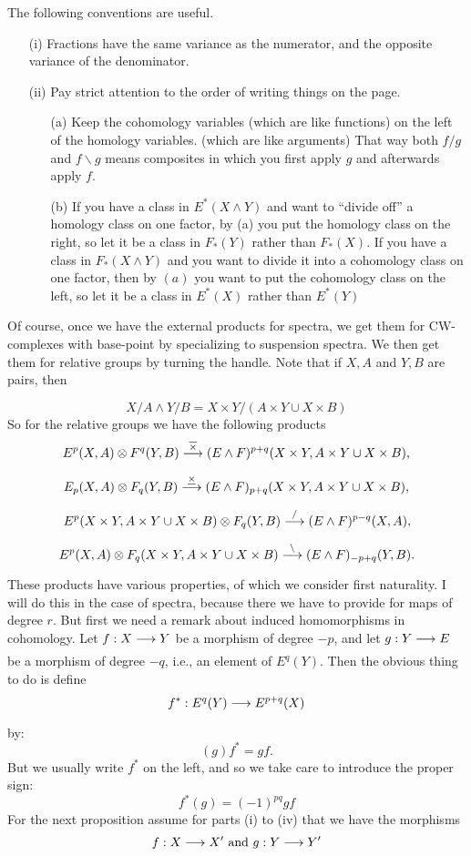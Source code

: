 \documentclass[../main]{subfiles}
\begin{document}
\begin{notes}
The following conventions are useful. 

\begin{enumerate}
    \item[(i)] Fractions have the same variance as the numerator, and the opposite variance of the denominator.
    \item [(ii)] Pay strict attention to the order of writing things on the page. 
    
    \begin{enumerate}
        \item[(a)] Keep the cohomology variables (which are like functions) on the left of the homology variables. (which are like arguments) That way both $f/g$ and $f \backslash g$ means composites in which you first apply $g$ and afterwards apply $f$.
        \item[(b)] If you have a class in $E^\ast(X \wedge Y)$ and want to ``divide off'' a homology class on one factor, by (a) you put the homology class on the right, so let it be a class in $F_\ast(Y)$ rather than $F_\ast(X)$. If you have a class in $F_\ast(X\wedge Y)$ and you want to divide it into a cohomology class on one factor, then by $(a)$ you want to put the cohomology class on the left, so let it be a class in $E^\ast(X)$ rather than $E^\ast (Y)$  
    \end{enumerate}
\end{enumerate}
\end{notes} 

Of course, once we have the external products for spectra, we get them for CW-complexes with base-point by specializing to suspension spectra. We then get them for relative groups by turning the handle. Note that if \(X, A\) and \(Y, B\) are pairs, then

\[X/A \wedge Y/B = X \times Y/(A \times Y \cup X \times B)\]
So for the relative groups we have the following products
\[E^p(X, A) \otimes F^q(Y, B) \lar{\overline \times} (E \wedge F)^{p + q}(X \times Y, A \times Y \cup X \times B),\]
\[E_p(X, A) \otimes F_q(Y, B) \lar{\underline \times} (E \wedge F)_{p + q}(X \times Y, A \times Y \cup X \times B),\]
\[E^p(X \times Y, A \times Y \cup X \times B) \otimes F_q(Y, B) \lar{/} (E \wedge F)^{p - q}(X, A),\]
\[E^p(X, A) \otimes F_q(X \times Y, A \times Y \cup X \times B) \lar{\backslash} (E \wedge F)_{-p + q}(Y, B).\]
These products have various properties, of which we consider first naturality. I will do this in the case of spectra, because there we have to provide for maps of degree $r$. But first we need a remark about induced homomorphisms in cohomology. Let \(f : X \lar{} Y\) be a morphism of degree $-p$, and let $g : Y \lar{} E$ be a morphism of degree $-q$, i.e., an element of $E^q(Y)$. Then the obvious thing to do is define 
\[f^\ast : E^q(Y) \lar{} E^{p + q}(X)\]
by: 
\[(g)f^\ast = gf.\]
But we usually write $f^\ast$ on the left, and so we take care to introduce the proper sign: 
\[f^\ast(g) = (-1)^{p q} gf\]
For the next proposition assume for parts (i) to (iv) that we have the morphisms
\[f : X \lar{} X' \text { and } g : Y \lar{} Y'\]
\end{document}
